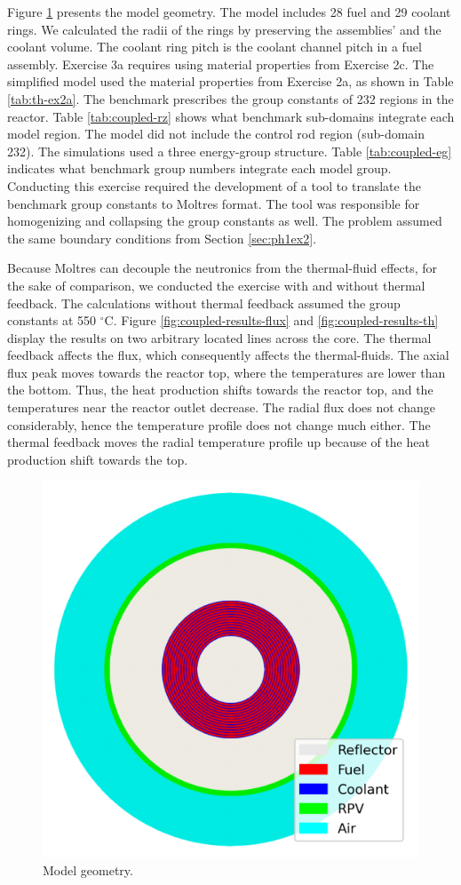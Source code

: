 Figure \ref{fig:coupled-mesh} presents the model geometry.
The model includes 28 fuel and 29 coolant rings.
We calculated the radii of the rings by preserving the assemblies' and the coolant volume.
The coolant ring pitch is the coolant channel pitch in a fuel assembly.
Exercise 3a requires using material properties from Exercise 2c.
The simplified model used the material properties from Exercise 2a, as shown in Table \ref{tab:th-ex2a}.
The benchmark prescribes the group constants of 232 regions in the reactor.
Table \ref{tab:coupled-rz} shows what benchmark sub-domains integrate each model region.
The model did not include the control rod region (sub-domain 232).
The simulations used a three energy-group structure.
Table \ref{tab:coupled-eg} indicates what benchmark group numbers integrate each model group.
Conducting this exercise required the development of a tool to translate the benchmark group constants to Moltres format.
The tool was responsible for homogenizing and collapsing the group constants as well.
The problem assumed the same boundary conditions from Section \ref{sec:ph1ex2}.

Because Moltres can decouple the neutronics from the thermal-fluid effects, for the sake of comparison, we conducted the exercise with and without thermal feedback.
The calculations without thermal feedback assumed the group constants at 550 $^{\circ}$C.
Figure \ref{fig:coupled-results-flux} and \ref{fig:coupled-results-th} display the results on two arbitrary located lines across the core.
The thermal feedback affects the flux, which consequently affects the thermal-fluids.
The axial flux peak moves towards the reactor top, where the temperatures are lower than the bottom.
Thus, the heat production shifts towards the reactor top, and the temperatures near the reactor outlet decrease.
The radial flux does not change considerably, hence the temperature profile does not change much either.
The thermal feedback moves the radial temperature profile up because of the heat production shift towards the top.

\begin{figure}[htbp!]
  \centering
  \includegraphics[width=0.45\linewidth]{figures-thermal/ex3-mesh}
  \hfill
  \caption{Model geometry.}
  \label{fig:coupled-mesh}
\end{figure}

